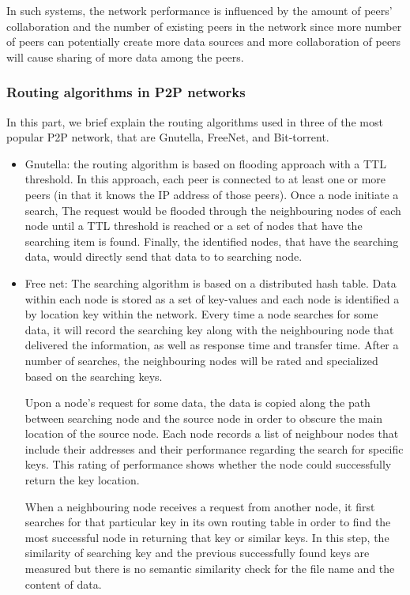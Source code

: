 \documentclass [12pt]{article} \usepackage{multicol}
\begin{document}
	In such systems, the network performance is influenced by the amount of peers' collaboration
	and the number of existing peers in the network since more number of peers
	can potentially create more data sources and more collaboration of peers will cause sharing of more data among the peers.

	\subsubsection{Routing algorithms in P2P networks}
	
	In this part, we brief explain the routing algorithms used in three of the most popular P2P network, that are Gnutella, FreeNet, and Bit-torrent. 
	
	\begin{itemize}
	\item	Gnutella:
			the routing algorithm is based
on flooding approach with a TTL threshold. In this approach, each
peer is connected to at least one or more peers (in that it knows the
IP address of those peers). Once a node initiate a search, The request would be flooded through
the neighbouring nodes of each node until a TTL threshold is reached or a set of nodes that have the searching item
is found. Finally, the identified nodes, that have the searching data, would directly send that data to to searching node.

	
	 \item	Free net:
	The searching algorithm is based on a distributed hash table.
	Data within each node is stored as a set of key-values and
	each node is identified  a by location key within the network.
	Every time a node searches for some data, it will record the
	searching key along with the neighbouring node that delivered
	the information, as well as response time and transfer time.
	After a number of searches, the neighbouring nodes will be
	rated and specialized based on the searching keys. 
	
	 Upon a node's request for some data, the data is
	copied along the path between searching node and the source
	node in order to obscure the main location of the source
	node. Each node records a list of neighbour nodes that
	include their addresses and their performance regarding the
	search for specific keys. This rating of performance shows
	whether the node could successfully return the key location.
	
	When a neighbouring node receives a request from another
	node, it first searches for that particular key in its own
	routing table in order to find the most successful node in
	returning that key or similar keys. In this step, the
	similarity of searching key and the previous
	successfully found keys are measured but there is no semantic
	similarity check for the file name and the content of data.
	

\end{itemize}
\end{document}
